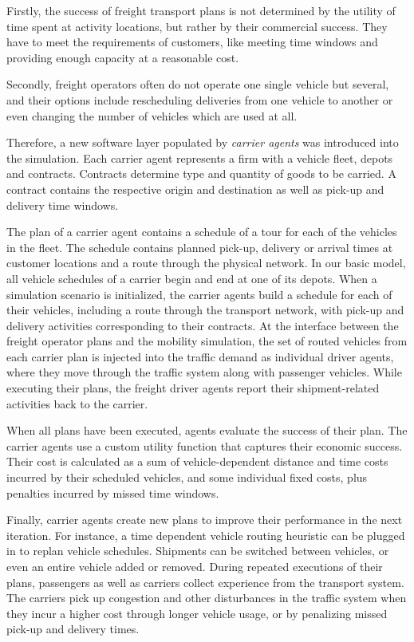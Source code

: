 Firstly, the success of freight transport plans is not determined by the utility of time
spent at activity locations, but rather by their commercial success. They have to meet the
requirements of customers, like meeting time windows and providing enough capacity at
a reasonable cost.

Secondly, freight operators often do not operate one single vehicle but several, and their
options include rescheduling deliveries from one vehicle to another or even changing the
number of vehicles which are used at all.

Therefore, a new software layer populated by \emph{carrier agents} was introduced into the
simulation. Each carrier agent represents a firm with a vehicle fleet, depots and contracts.
Contracts determine type and quantity of goods to be carried. A contract contains the respective 
origin and destination as well as pick-up and delivery time windows.

The plan of a carrier agent contains a schedule of a tour for each of the vehicles in the fleet. 
The schedule contains planned pick-up, delivery or arrival times at customer locations and a route through 
the physical network. In our basic model, all vehicle schedules of a carrier begin and end at one of its depots.
When a simulation scenario is initialized, the carrier agents build a schedule for each of their vehicles, 
including a route through the transport network, with pick-up and delivery activities corresponding to their contracts.
At the interface between the freight operator plans and the mobility simulation, the set of routed vehicles 
from each carrier plan is injected into the traffic demand as individual driver agents, where they move 
through the traffic system along with passenger vehicles. While executing their plans, the freight driver 
agents report their shipment-related activities back to the carrier.

When all plans have been executed, agents evaluate the success of their plan. The carrier agents use a custom 
utility function that captures their economic success. Their cost is calculated as a sum of vehicle-dependent 
distance and time costs incurred by their scheduled vehicles, and some individual fixed costs, plus penalties 
incurred by missed time windows.

Finally, carrier agents create new plans to improve their performance in the next iteration. For instance, 
a time dependent vehicle routing heuristic can be plugged in to replan vehicle schedules. Shipments can be 
switched between vehicles, or even an entire vehicle added or removed.
During repeated executions of their plans, passengers as well as carriers collect experience from the transport 
system. The carriers pick up congestion and other disturbances in the traffic system when they incur a higher 
cost through longer vehicle usage, or by penalizing missed pick-up and delivery times.

